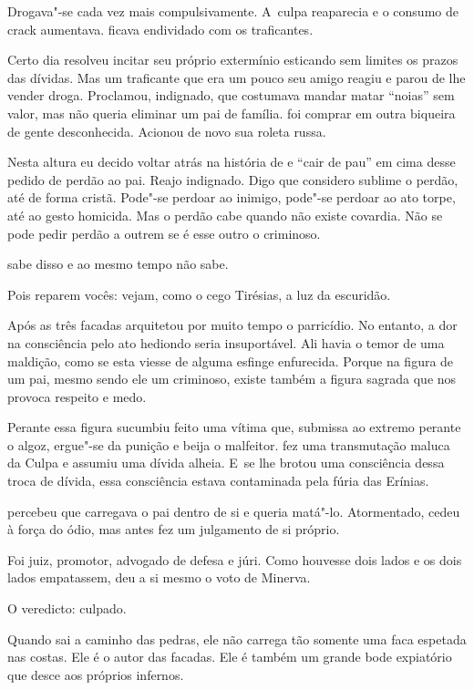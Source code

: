 Drogava"-se cada vez mais compulsivamente. A~culpa reaparecia e o consumo
de crack aumentava.  ficava endividado com os traficantes.

Certo dia  resolveu incitar seu próprio extermínio esticando sem
limites os prazos das dívidas. Mas um traficante que era um pouco seu
amigo reagiu e parou de lhe vender droga. Proclamou, indignado, que
costumava mandar matar ``noias'' sem valor, mas não queria eliminar um pai
de família.  foi comprar em outra biqueira de gente desconhecida.
Acionou de novo sua roleta russa.

Nesta altura eu decido voltar atrás na história de  e ``cair de pau''
em cima desse pedido de perdão ao pai. Reajo indignado. Digo que
considero sublime o perdão, até de forma cristã. Pode"-se perdoar ao
inimigo, pode"-se perdoar ao ato torpe, até ao gesto homicida. Mas o
perdão cabe quando não existe covardia. Não se pode pedir perdão a
outrem se é esse outro o criminoso.

 sabe disso e ao mesmo tempo não sabe.

Pois reparem vocês: vejam, como o cego Tirésias, a luz da escuridão.

Após as três facadas  arquitetou por muito tempo o parricídio. No
entanto, a dor na consciência pelo ato hediondo seria insuportável. Ali
havia o temor de uma maldição, como se esta viesse de alguma esfinge
enfurecida. Porque na figura de um pai, mesmo sendo ele um criminoso,
existe também a figura sagrada que nos provoca respeito e medo.

Perante essa figura  sucumbiu feito uma vítima que, submissa ao
extremo perante o algoz, ergue"-se da punição e beija o malfeitor.  fez
uma transmutação maluca da Culpa e assumiu uma dívida alheia. E~se lhe
brotou uma consciência dessa troca de dívida, essa consciência estava
contaminada pela fúria das Erínias.

 percebeu que carregava o pai dentro de si e queria matá"-lo.
Atormentado, cedeu à força do ódio, mas antes fez um julgamento de si
próprio.

Foi juiz, promotor, advogado de defesa e júri. Como houvesse dois lados
e os dois lados empatassem,  deu a si mesmo o voto de Minerva.

O veredicto: culpado.

\asterisc{}

Quando  sai a caminho das pedras, ele não carrega tão somente uma faca
espetada nas costas. Ele é o autor das facadas. Ele é também um grande
bode expiatório que desce aos próprios infernos.

